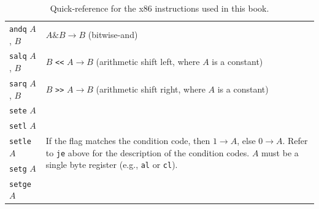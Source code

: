 \documentclass[11pt]{book}
\begin{document}
\begin{table}[tbp]
\begin{tabular}{l|l}
\texttt{andq} $A$, $B$ & $A \& B \to B$ \qquad (bitwise-and)\\
\texttt{salq} $A$, $B$ & $B$ \texttt{<<} $A \to B$ (arithmetic shift left, where $A$ is a constant)\\
\texttt{sarq} $A$, $B$ & $B$ \texttt{>>} $A \to B$ (arithmetic shift right, where $A$ is a constant)\\
\texttt{sete} $A$ & \multirow{5}{3.7in}{If the flag matches the condition code,
   then $1 \to A$, else $0 \to A$. Refer to \texttt{je} above for the
   description of the condition codes. $A$ must be a single byte register
   (e.g., \texttt{al} or \texttt{cl}).} \\
\texttt{setl} $A$ & \\
\texttt{setle} $A$ & \\
\texttt{setg} $A$ & \\
\texttt{setge} $A$ &
\end{tabular}
\vspace{5pt}
  \caption{Quick-reference for the x86 instructions used in this book.}
  \label{tab:x86-instr}
\end{table}





\end{document}
